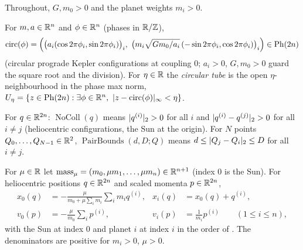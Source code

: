 Throughout, $G,m_0>0$ and the planet weights $m_i>0$.

\begin{definition}\label{bpP:p0:circular}
For $m,a\in\mathbb{R}^n$ and $\phi\in\mathbb{R}^n$ (phases in $\mathbb{R}/\mathbb{Z}$),
\[\operatorname{circ}(\phi)=\Bigl(\bigl(a_i(\cos2\pi\phi_i,\sin2\pi\phi_i)\bigr)_i,\ \bigl(m_i\sqrt{Gm_0/a_i}\,(-\sin2\pi\phi_i,\cos2\pi\phi_i)\bigr)_i\Bigr)\in\Ph{2n}\]
(circular prograde Kepler configurations at coupling $0$; $a_i>0$, $G,m_0>0$ guard the square root and the division). For
$\eta\in\mathbb{R}$ the \emph{circular tube} is the open $\eta$-neighbourhood in the phase max norm,
$U_\eta=\{z\in\Ph{2n}:\exists\phi\in\R^n,\ \abs{z-\operatorname{circ}(\phi)}_\infty<\eta\}$.
\end{definition}

\begin{definition}\label{bpP:p0:nocoll}
For $q\in\mathbb{R}^{2n}$: $\operatorname{NoColl}(q)$ means $\lvert q^{(i)}\rvert_2>0$ for all $i$ and $\lvert q^{(i)}-q^{(j)}\rvert_2>0$ for all $i\ne j$
(heliocentric configurations, the Sun at the origin). For $N$ points $Q_0,\dots,Q_{N-1}\in\mathbb{R}^2$,
$\operatorname{PairBounds}(d,D;Q)$ means $d\le\lvert Q_j-Q_i\rvert_2\le D$ for all $i\neq j$.
\end{definition}

\begin{definition}\label{bpP:p0:barycentric}
For $\mu\in\mathbb{R}$ let $\operatorname{mass}_\mu=(m_0,\mu m_1,\dots,\mu m_n)\in\mathbb{R}^{n+1}$ (index $0$ is the Sun). For heliocentric positions
$q\in\mathbb{R}^{2n}$ and scaled momenta $p\in\mathbb{R}^{2n}$,
\begin{align*}
x_0(q)&=-\frac{\mu}{m_0+\mu\sum_im_i}\sum_im_iq^{(i)},&x_i(q)&=x_0(q)+q^{(i)},\\
v_0(p)&=-\frac{\mu}{m_0}\sum_ip^{(i)},&v_i(p)&=\frac1{m_i}p^{(i)}\qquad(1\le i\le n),
\end{align*}
with the Sun at index $0$ and planet $i$ at index $i$ in the order of . The denominators are positive for
$m_i>0$, $\mu>0$.
\end{definition}

